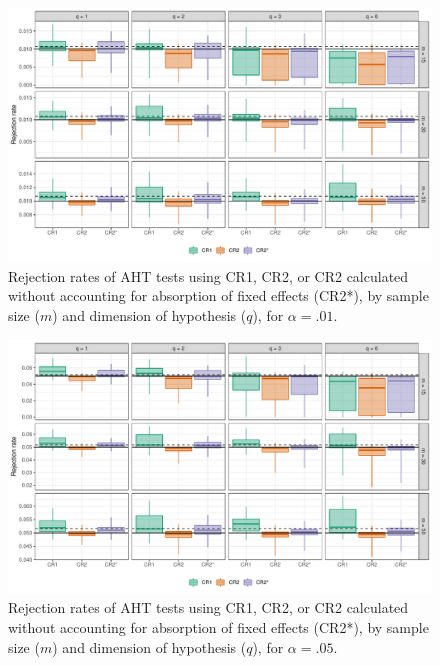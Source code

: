 \documentclass[12pt]{article}
\begin{document}
\begin{landscape}
\begin{figure}[p]

{\centering \includegraphics[width=\linewidth]{CR_fig/absorption_01-1} 

}

\caption{Rejection rates of AHT tests using CR1, CR2, or CR2 calculated without accounting for absorption of fixed effects (CR2*), by sample size ($m$) and dimension of hypothesis ($q$), for $\alpha = .01$.}\label{fig:absorption_01}
\end{figure}

\begin{figure}[p]

{\centering \includegraphics[width=\linewidth]{CR_fig/absorption_05-1} 

}

\caption{Rejection rates of AHT tests using CR1, CR2, or CR2 calculated without accounting for absorption of fixed effects (CR2*), by sample size ($m$) and dimension of hypothesis ($q$), for $\alpha = .05$.}\label{fig:absorption_05}
\end{figure}


\end{landscape}
\end{document}
